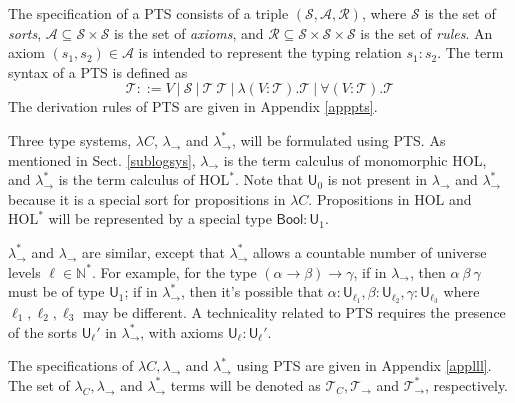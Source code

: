   The specification of a PTS consists of a triple $(\mathcal{S}, \mathcal{A}, \mathcal{R})$,
  where $\mathcal{S}$ is the set of \textit{sorts}, $\mathcal{A} \subseteq \mathcal{S} \times \mathcal{S}$ is
  the set of \textit{axioms}, and $\mathcal{R} \subseteq \mathcal{S} \times \mathcal{S} \times \mathcal{S}$
  is the set of \textit{rules}. An axiom $(s_1, s_2) \in \mathcal{A}$ is intended to represent
  the typing relation $s_1 : s_2$. The term syntax of a PTS is defined as
  $$\mathcal{T} ::= V \ | \ \mathcal{S} \ | \ \mathcal{T} \ \mathcal{T} \ |
    \ \lambda (V : \mathcal{T}). \mathcal{T} \ | \ \forall (V : \mathcal{T}). \mathcal{T}$$
  \noindent The derivation rules of PTS are given in Appendix \ref{apppts}.

  Three type systems, $\lambda C$, $\lambda_\to$ and $\lambda_\to^*$, will be formulated
  using PTS. As mentioned in Sect. \ref{sublogsys}, $\lambda_\to$
  is the term calculus of monomorphic HOL, and $\lambda_\to^*$ is the term
  calculus of $\text{HOL}^*$. Note that $\mathsf{U}_0$ is not present in $\lambda_\to$ and $\lambda_\to^*$
  because it is a special sort for propositions in $\lambda C$.
  Propositions in $\text{HOL}$ and $\text{HOL}^*$ will be represented by
  a special type $\mathsf{Bool} : \mathsf{U}_1$.
  
  $\lambda_\to^*$ and $\lambda_\to$ are similar, except that $\lambda_\to^*$ allows a
  countable number of universe levels $\ell \in \mathbb{N}^*$. For example,
  for the type $(\alpha \to \beta) \to \gamma$, if in $\lambda_\to$,
  then $\alpha \ \beta \ \gamma$ must be of type $\mathsf{U}_1$; if in
  $\lambda_\to^*$, then it's possible that $\alpha : \mathsf{U}_{\ell_1},
  \beta : \mathsf{U}_{\ell_2}, \gamma : \mathsf{U}_{\ell_3}$ where $\ell_1, \ell_2, \ell_3$
  may be different. A technicality related to PTS requires the presence of
  the sorts $\mathsf{U}_\ell'$ in $\lambda_\to^*$, with axioms $\mathsf{U}_\ell : \mathsf{U}_\ell'$.

  The specifications of $\lambda C, \lambda_\to$ and $\lambda_\to^*$ using PTS are given in
  Appendix \ref{applll}. The set of $\lambda_C, \lambda_\to$ and $\lambda_\to^*$ terms will be
  denoted as $\mathcal{T}_C, \mathcal{T}_\to$ and $\mathcal{T}_\to^*$, respectively.